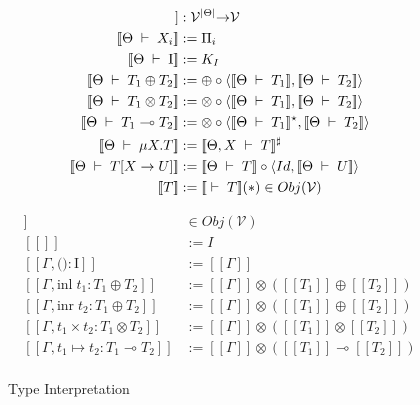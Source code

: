 \documentclass[a4j, dvipdfmx]{jsarticle}
\theoremstyle{definition}
\newcommand{\semantics}[1]{[\![ #1 ]\!]}
\newcommand{\judge}[2]{[\![ #1 \;\vdash\; #2 ]\!]}
\begin{document}
\begin{figure}[H]
  \begin{minipage}[b]{0.48\columnwidth}
    \begin{align*}
      \judge{\Theta}{T}                  &: \mathcal{V}^{|\Theta|} {\bf\rightarrow} \mathcal{V} \\
      \judge{\Theta}{X_i}                &:= \Pi_i \\
      \judge{\Theta}{\mathrm{I}}         &:= K_I \\
      \judge{\Theta}{T_1\oplus{}T_2}     &:= \oplus\circ\langle\judge{\Theta}{T_1},\judge{\Theta}{T_2}\rangle \\
      \judge{\Theta}{T_1\otimes{}T_2}    &:= \otimes\circ\langle\judge{\Theta}{T_1},\judge{\Theta}{T_2}\rangle \\
      \judge{\Theta}{T_1\multimap{}T_2}  &:= \otimes\circ\langle\judge{\Theta}{T_1}^\star,\judge{\Theta}{T_2}\rangle \\
      \judge{\Theta}{\mu{X}.T}           &:= \judge{\Theta,X}{T}^\sharp \\
      \judge{\Theta}{T[X \rightarrow U]} &:= \judge{\Theta}{T}\circ\langle{Id,\judge{\Theta}{U}}\rangle \\
      \semantics{T}                      &:= \judge{}{T}(\ast) \in Obj(\mathcal{V})
    \end{align*}
    \caption{Type Interpretation}
    \label{fig:ty_interpret}
  \end{minipage}
  \begin{minipage}[b]{0.48\columnwidth}
    \begin{align*}
      \semantics{\Gamma} &\in Obj(\mathcal{V}) \\
      \semantics{} &:= I \\
      \semantics{\Gamma,\text{()}:\mathrm{I}} &:= \semantics{\Gamma} \\
      \semantics{\Gamma,\text{inl}\;t_1:T_1\oplus{}T_2} &:= \semantics{\Gamma}\otimes(\semantics{T_1}\oplus\semantics{T_2}) \\
      \semantics{\Gamma,\text{inr}\;t_2:T_1\oplus{}T_2} &:= \semantics{\Gamma}\otimes(\semantics{T_1}\oplus\semantics{T_2}) \\
      \semantics{\Gamma,t_1\times{}t_2:T_1\otimes{}T_2} &:= \semantics{\Gamma}\otimes(\semantics{T_1}\otimes\semantics{T_2}) \\
      \semantics{\Gamma,t_1\mapsto{}t_2:T_1\multimap{}T_2} &:= \semantics{\Gamma}\otimes(\semantics{T_1}\multimap\semantics{T_2}) \\

\end{align*}
\end{minipage}
\end{figure}
\end{document}
